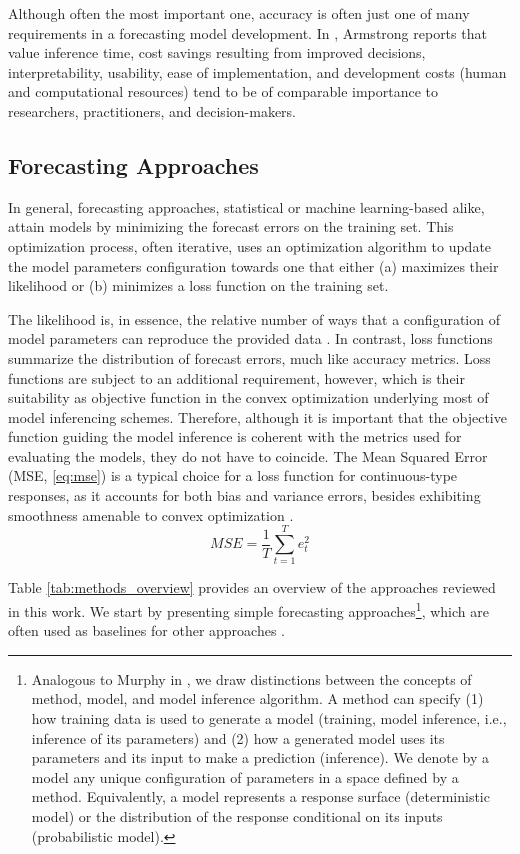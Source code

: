 Although often the most important one, accuracy is often just one of many requirements in a forecasting model development. In \cite{armstrong2002principles}, Armstrong reports that value inference time, cost savings resulting from improved decisions, interpretability, usability, ease of implementation, and development costs (human and computational resources) tend to be of comparable importance to researchers, practitioners, and decision-makers.

\subsection{Forecasting Approaches}

In general, forecasting approaches, statistical or machine learning-based alike, attain models by minimizing the forecast errors on the training set. This optimization process, often iterative, uses an optimization algorithm to update the model parameters configuration towards one that either (a) maximizes their likelihood or (b) minimizes a loss function on the training set.

The likelihood is, in essence, the relative number of ways that a configuration of model parameters can reproduce the provided data \cite{mcelreath2020rethinking}. In contrast, loss functions summarize the distribution of forecast errors, much like accuracy metrics. Loss functions are subject to an additional requirement, however, which is their suitability  as objective function in the convex optimization underlying most of model inferencing schemes. Therefore, although it is important that the objective function guiding the model inference is coherent with the metrics used for evaluating the models, they do not have to coincide. The Mean Squared Error (MSE, \ref{eq:mse}) is a typical choice for a loss function for continuous-type responses, as it accounts for both bias and variance errors, besides exhibiting smoothness amenable to convex optimization \cite{goodfellow2016deep}.
\begin{equation}\label{eq:mse}
    MSE = \frac{1}{T}\sum_{t=1}^T e^2_t
\end{equation}

Table \ref{tab:methods_overview} provides an overview of the approaches reviewed in this work. We start by presenting simple forecasting approaches\footnote[1]{Analogous to Murphy in \cite{murphy2012probabilistic}, we draw distinctions between the concepts of method, model, and model inference algorithm. A method can specify (1) how training data is used to generate a model (training, model inference, i.e., inference of its parameters) and (2) how a generated model uses its parameters and its input to make a prediction (inference). We denote by a model any unique configuration of parameters in a space defined by a method. Equivalently, a model represents a response surface (deterministic model) or the distribution of the response conditional on its inputs (probabilistic model).}, which are often used as baselines for other approaches \cite{hyndman2018principles}.

